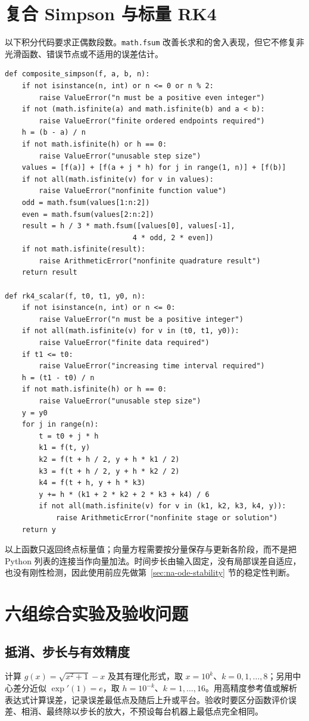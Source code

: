 \documentclass[UTF8,12pt,a4paper,fontset=fandol]{ctexbook}
\begin{document}
\section{复合 Simpson 与标量 RK4}
以下积分代码要求正偶数段数。\texttt{math.fsum} 改善长求和的舍入表现，但它不修复非光滑函数、错误节点或不适用的误差估计。
\begin{verbatim}
def composite_simpson(f, a, b, n):
    if not isinstance(n, int) or n <= 0 or n % 2:
        raise ValueError("n must be a positive even integer")
    if not (math.isfinite(a) and math.isfinite(b) and a < b):
        raise ValueError("finite ordered endpoints required")
    h = (b - a) / n
    if not math.isfinite(h) or h == 0:
        raise ValueError("unusable step size")
    values = [f(a)] + [f(a + j * h) for j in range(1, n)] + [f(b)]
    if not all(math.isfinite(v) for v in values):
        raise ValueError("nonfinite function value")
    odd = math.fsum(values[1:n:2])
    even = math.fsum(values[2:n:2])
    result = h / 3 * math.fsum([values[0], values[-1],
                              4 * odd, 2 * even])
    if not math.isfinite(result):
        raise ArithmeticError("nonfinite quadrature result")
    return result

def rk4_scalar(f, t0, t1, y0, n):
    if not isinstance(n, int) or n <= 0:
        raise ValueError("n must be a positive integer")
    if not all(math.isfinite(v) for v in (t0, t1, y0)):
        raise ValueError("finite data required")
    if t1 <= t0:
        raise ValueError("increasing time interval required")
    h = (t1 - t0) / n
    if not math.isfinite(h) or h == 0:
        raise ValueError("unusable step size")
    y = y0
    for j in range(n):
        t = t0 + j * h
        k1 = f(t, y)
        k2 = f(t + h / 2, y + h * k1 / 2)
        k3 = f(t + h / 2, y + h * k2 / 2)
        k4 = f(t + h, y + h * k3)
        y += h * (k1 + 2 * k2 + 2 * k3 + k4) / 6
        if not all(math.isfinite(v) for v in (k1, k2, k3, k4, y)):
            raise ArithmeticError("nonfinite stage or solution")
    return y
\end{verbatim}
以上函数只返回终点标量值；向量方程需要按分量保存与更新各阶段，而不是把 Python 列表的连接当作向量加法。时间步长由输入固定，没有局部误差自适应，也没有刚性检测，因此使用前应先做第~\ref{sec:na-ode-stability} 节的稳定性判断。

\section{六组综合实验及验收问题}
\subsection{抵消、步长与有效精度}
计算 $g(x)=\sqrt{x^2+1}-x$ 及其有理化形式，取 $x=10^k$、$k=0,1,\ldots,8$；另用中心差分近似 $\exp'(1)=e$，取 $h=10^{-k}$、$k=1,\ldots,16$。用高精度参考值或解析表达式计算误差，记录误差最低点及随后上升或平台。验收时要区分函数评价误差、相消、最终除以步长的放大，不预设每台机器上最低点完全相同。
\end{document}
